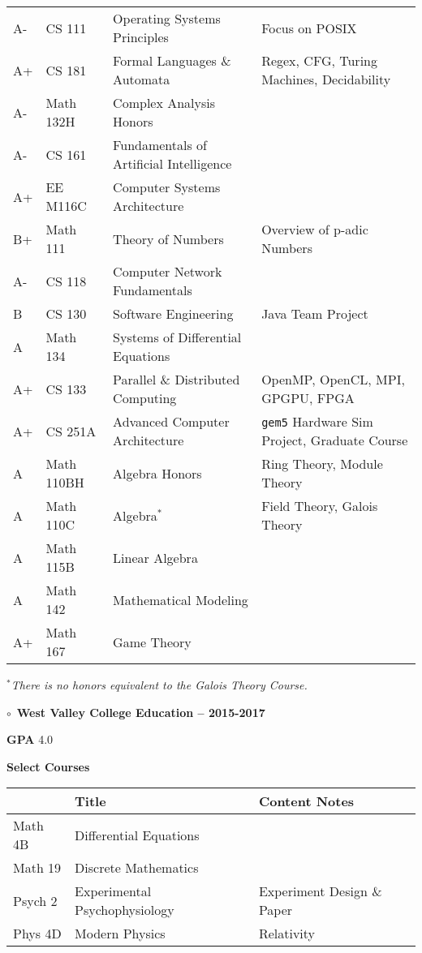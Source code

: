 \documentclass[11pt]{article}
\newcommand{\myTitle}[1]{{ \vspace{2mm} \large \color{titleColor} \hspace{-12mm} \( \circ \)\ \textbf{\textsf{#1}} \vspace{2mm}}}
\newcommand{\myKey}[1]{{\color{keyColor}\textbf{#1}}}
\begin{document}
{\begin{tabular}{l l l l}
\rowcolor{oddColor}
A- & CS 111 & Operating Systems Principles & Focus on POSIX \\
\rowcolor{oddColor}
A+ & CS 181 & Formal Languages \& Automata & Regex, CFG, Turing Machines, Decidability \\
\rowcolor{oddColor}
A- & Math 132H & Complex Analysis Honors & \\

\rowcolor{evenColor}
A- & CS 161 & Fundamentals of Artificial Intelligence & \\
\rowcolor{evenColor}
A+ & EE M116C & Computer Systems Architecture & \\
\rowcolor{evenColor}
B+ & Math 111 & Theory of Numbers & Overview of p-adic Numbers \\

\rowcolor{oddColor}
A- & CS 118 & Computer Network Fundamentals & \\
\rowcolor{oddColor}
B  & CS 130 & Software Engineering & Java Team Project \\
\rowcolor{oddColor}
A  & Math 134 & Systems of Differential Equations & \\

\rowcolor{evenColor}
A+ & CS 133 & Parallel \& Distributed Computing & OpenMP, OpenCL, MPI, GPGPU, FPGA \\
\rowcolor{evenColor}
A+ & CS 251A & Advanced Computer Architecture & \texttt{gem5} Hardware Sim Project, Graduate Course \\
\rowcolor{evenColor}
A  & Math 110BH & Algebra Honors & Ring Theory, Module Theory \\

\rowcolor{oddColor}
A  & Math 110C & Algebra\( ^* \) & Field Theory, Galois Theory \\
\rowcolor{oddColor}
A  & Math 115B & Linear Algebra & \\

\rowcolor{evenColor}
A & Math 142 & Mathematical Modeling & \\
\rowcolor{evenColor}
A+ & Math 167 & Game Theory & \\
\hline
\end{tabular}
}

\textit{\( ^* \)There is no honors equivalent to the Galois Theory Course.}

\myTitle{West Valley College Education -- 2015-2017}

\myKey{GPA} 4.0

\myKey{Select Courses}

\begin{tabular}{l l l}
\hline
 & Title & Content Notes \\
\hline
\rowcolor{oddColor} Math 4B & Differential Equations & \\
\rowcolor{oddColor} Math 19 & Discrete Mathematics & \\
\rowcolor{oddColor}
Psych 2 & Experimental Psychophysiology & Experiment Design \& Paper \\
\rowcolor{oddColor} Phys 4D & Modern Physics & Relativity \\
\hline
\end{tabular}
\end{document}
